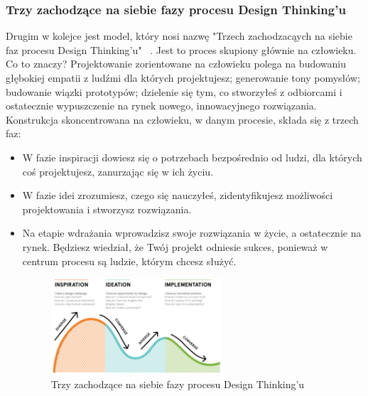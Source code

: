 \documentclass[a4paper,titleauthor]{mwart}
\begin{document}
 \subsubsection{Trzy zachodzące na siebie fazy procesu Design Thinking'u}

Drugim w kolejce jest model, który nosi nazwę "Trzech zachodzacąych na siebie faz procesu Design Thinking'u" ~\cite{Proces2}. Jest to proces skupiony głównie na człowieku. \newline \newline 
Co to znaczy? \newline \newline
 Projektowanie zorientowane na człowieku polega na budowaniu głębokiej empatii z ludźmi dla których projektujesz; generowanie tony pomysłów; budowanie wiązki prototypów; dzielenie się tym, co stworzyłeś z odbiorcami i ostatecznie wypuszczenie na rynek nowego, innowacyjnego rozwiązania. \newline \newline
Konstrukcja skoncentrowana na człowieku, w danym procesie, składa się z trzech faz:\newline
 \begin{itemize}
 \item W fazie inspiracji dowiesz się o potrzebach bezpośrednio od ludzi, dla których coś projektujesz, zanurzając się w ich życiu. 
 \item W fazie idei zrozumiesz, czego się nauczyłeś, zidentyfikujesz możliwości projektowania i stworzysz rozwiązania. 
 \item Na etapie wdrażania wprowadzisz swoje rozwiązania w życie, a ostatecznie na rynek. Będziesz wiedział, że Twój projekt odniesie sukces, ponieważ w centrum procesu są ludzie, którym chcesz służyć. \newline \newline
 
\begin{figure}[h]
 	\centering
 	\includegraphics[width=0.6\textwidth]{2}
 	\caption{Trzy zachodzące na siebie fazy procesu Design Thinking'u}
 \end{figure}

\end{itemize}
\end{document}
